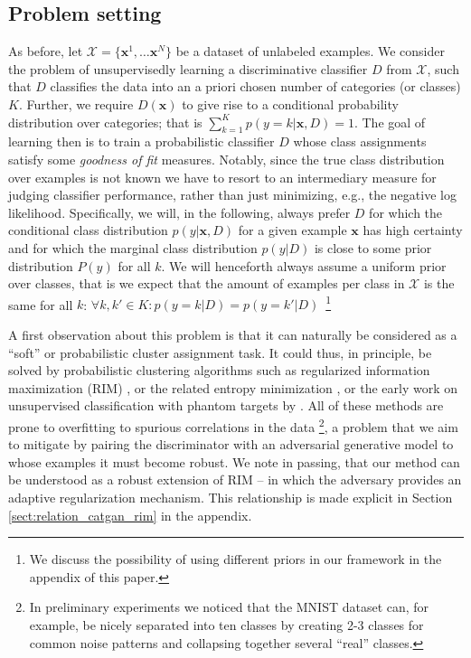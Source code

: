 \documentclass{article} \usepackage{iclr2016_conference,times}
\newcommand{\bx}{\mathbf{x}}
\begin{document}
\subsection{Problem setting}
\label{sect:problem}
As before, let $\mathcal{X} = \lbrace \bx^1, \dots \bx^N \rbrace$ be a
dataset of unlabeled examples. We consider the problem of
unsupervisedly learning a discriminative classifier $D$ from
$\mathcal{X}$, such that $D$ classifies the data into an a priori chosen
number of categories (or classes) $K$. Further, we require $D(\bx)$ to
give rise to a conditional probability distribution over categories;
that is $\sum_{k=1}^K p(y = k | \bx, D) = 1$. The goal of learning
then is to train a probabilistic classifier $D$ whose class
assignments satisfy some \emph{goodness of fit} measures. Notably,
since the true class distribution over examples is not known we have
to resort to an intermediary measure for judging classifier
performance, rather than just minimizing, e.g., the negative log
likelihood. Specifically, we will, in the following, always prefer $D$
for which the conditional class distribution $p(y | \bx, D)$ for a
given example $\bx$ has high certainty and for which
the marginal class distribution $p(y | D)$ is close to some prior
distribution $P(y)$ for all $k$. We will henceforth always assume a
uniform prior over classes, that is we expect that the amount of
examples per class in $\mathcal{X}$ is the same for all $k$:
$\forall k,k' \in K: p(y = k | D) = p(y = k' | D)$~\footnote{We
  discuss the possibility of using different priors in our framework
  in the appendix of this paper.}

A first observation about this problem is that it can naturally be
considered as a ``soft'' or probabilistic cluster assignment task. It
could thus, in principle, be solved by probabilistic clustering
algorithms such as regularized information maximization (RIM)
\citep{Krause_2010}, or the related entropy minimization
\citep{Grandvalet_2004}, or the early work on unsupervised
classification with phantom targets by \citet{Bridle_91}. All of these
methods are prone to overfitting to spurious correlations in the data
\footnote{In preliminary experiments we noticed that the MNIST dataset
  can, for example, be nicely separated into ten classes by creating
  2-3 classes for common noise patterns and collapsing together
  several ``real'' classes.}, a problem that we aim to mitigate by
pairing the discriminator with an adversarial generative model to
whose examples it must become robust. We note in passing, that our
method can be understood as a robust extension of RIM -- in which the
adversary provides an adaptive regularization mechanism. This
relationship is made explicit in Section
\ref{sect:relation_catgan_rim} in the appendix.
\end{document}
